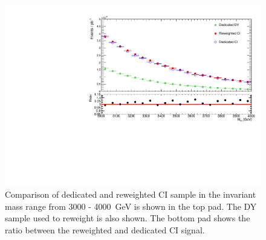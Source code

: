 \begin{figure}[h]
    \centering
    \includegraphics[width=\mediumfigwidth]{figures/analysis/datamc/sigmodel/CICompare.pdf}
    \caption[Validation of signal reweighting]{Comparison of dedicated and reweighted CI sample in the invariant mass range from 3000 - \SI{4000}{\giga\electronvolt} is shown in the top pad. The DY sample used to reweight is also shown. The bottom pad shows the ratio between the reweighted and dedicated CI signal.}
    \label{fig:datamc:sigValidate}
\end{figure}

